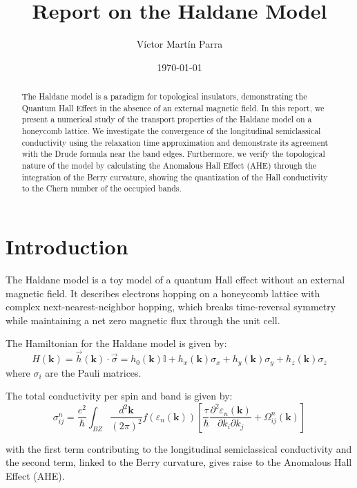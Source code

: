 \documentclass[12pt,a4paper]{article}
\title{Report on the Haldane Model}
\author{Víctor Martín Parra}
\date{\today}
\newcommand{\kk}{\mathbf{k}}
\begin{document}
\maketitle

\begin{abstract}
    The Haldane model is a paradigm for topological insulators, demonstrating the Quantum Hall Effect in the absence of an external magnetic field. In this report, we present a numerical study of the transport properties of the Haldane model on a honeycomb lattice. We investigate the convergence of the longitudinal semiclassical conductivity using the relaxation time approximation and demonstrate its agreement with the Drude formula near the band edges. Furthermore, we verify the topological nature of the model by calculating the Anomalous Hall Effect (AHE) through the integration of the Berry curvature, showing the quantization of the Hall conductivity to the Chern number of the occupied bands.
\end{abstract}

\tableofcontents

\newpage

\section{Introduction}
The Haldane model is a toy model of a quantum Hall effect without an external magnetic field. It describes electrons hopping on a honeycomb lattice with complex next-nearest-neighbor hopping, which breaks time-reversal symmetry while maintaining a net zero magnetic flux through the unit cell.

The Hamiltonian for the Haldane model is given by:
\begin{equation}
    H(\mathbf{k}) = \vec{h}(\mathbf{k}) \cdot \vec{\sigma} = h_0(\mathbf{k})\mathbb{I} + h_x(\mathbf{k})\sigma_x + h_y(\mathbf{k})\sigma_y + h_z(\mathbf{k})\sigma_z
\end{equation}
where $\sigma_i$ are the Pauli matrices.

The total conductivity per spin and band is given by:
\begin{equation}
    \sigma_{ij}^n = \frac{e^2}{\hbar} \int_{BZ} \frac{d^2\kk}{(2\pi)^2}f\left(\varepsilon_n(\kk)\right) \left[ \frac{\tau}{\hbar} \frac{\partial^2\varepsilon_n(\kk)}{\partial k_i \partial k_j} + \Omega_{ij}^n(\kk) \right]
\end{equation}

with the first term contributing to the longitudinal semiclassical conductivity and the second term, linked to the Berry curvature, gives raise to the Anomalous Hall Effect (AHE).
\end{document}
